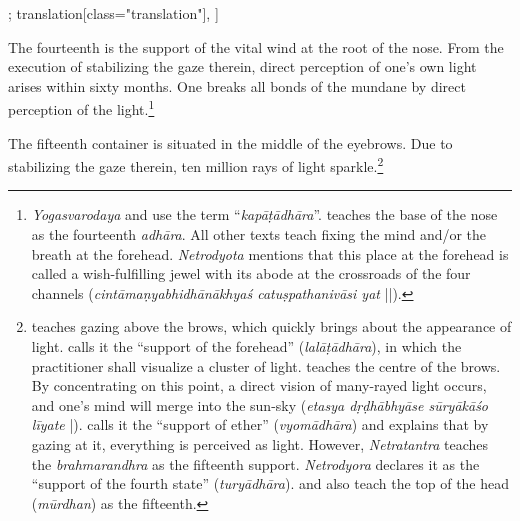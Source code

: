 \begin{alignment}[
  texts=edition[class="edition"];
  translation[class="translation"],
  ]
\begin{translation}
\begin{tlate}[p30_05]
      The fourteenth is the support of the vital wind at the root of the nose. From the execution of stabilizing the gaze therein, direct perception of one's own light arises within sixty months. One breaks all bonds of the mundane by direct perception of the light.\footnote{\textit{Yogasvarodaya} and  use the term ``\textit{kapāṭādhāra}''.  teaches the base of the nose as the fourteenth \textit{adhāra}. All other texts teach fixing the mind and/or the breath at the forehead. \textit{Netrodyota} mentions that this place at the forehead is called a wish-fulfilling jewel with its abode at the crossroads of the four channels (\textit{cintāmaṇyabhidhānākhyaś catuṣpathanivāsi yat} ||).}     
            
      The fifteenth container is situated in the middle of the eyebrows. Due to stabilizing the gaze therein, ten million rays of light sparkle.\footnote{ teaches gazing above the brows, which quickly brings about the appearance of light.  calls it the ``support of the forehead'' (\textit{lalāṭādhāra}), in which the practitioner shall visualize a cluster of light.  teaches the centre of the brows. By concentrating on this point, a direct vision of many-rayed light occurs, and one's mind will merge into the sun-sky (\textit{etasya dṛḍhābhyāse sūryākāśo līyate} |).  calls it the ``support of ether'' (\textit{vyomādhāra}) and explains that by gazing at it, everything is perceived as light. However, \textit{Netratantra} teaches the \textit{brahmarandhra} as the fifteenth support. \textit{Netrodyora} declares it as the ``support of the fourth state'' (\textit{turyādhāra}).  and  also teach the top of the head (\textit{mūrdhan}) as the fifteenth.}
      

\end{tlate}
\end{translation}
\end{alignment}
